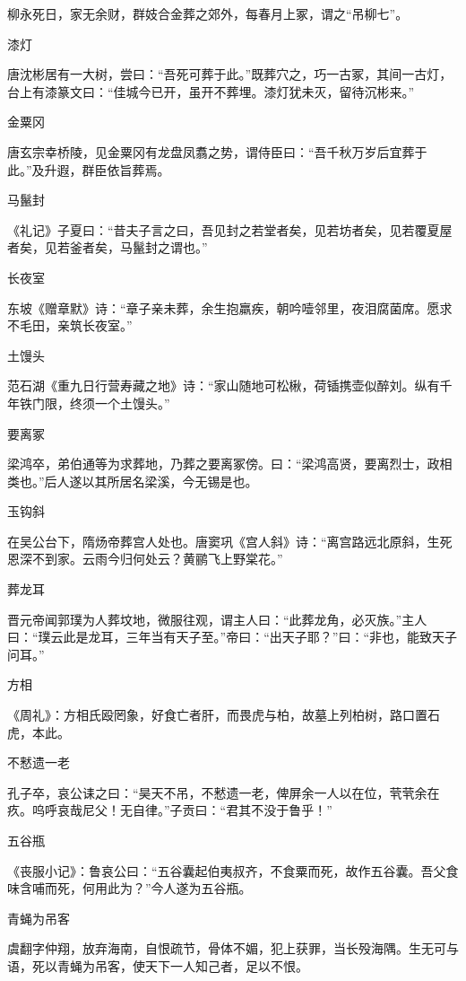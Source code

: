 \documentclass[a4paper,12pt,UTF8,twoside]{ctexbook}
\begin{document}
    柳永死日，家无余财，群妓合金葬之郊外，每春月上冢，谓之“吊柳七”。
    
    漆灯
    
    唐沈彬居有一大树，尝曰：“吾死可葬于此。”既葬穴之，巧一古冢，其间一古灯，台上有漆篆文曰：“佳城今已开，虽开不葬埋。漆灯犹未灭，留待沉彬来。”
    
    金粟冈
    
    唐玄宗幸桥陵，见金粟冈有龙盘凤翥之势，谓侍臣曰：“吾千秋万岁后宜葬于此。”及升遐，群臣依旨葬焉。
    
    马鬣封
    
    《礼记》子夏曰：“昔夫子言之曰，吾见封之若堂者矣，见若坊者矣，见若覆夏屋者矣，见若釜者矣，马鬣封之谓也。”
    
    长夜室
    
    东坡《赠章默》诗：“章子亲未葬，余生抱羸疾，朝吟噎邻里，夜泪腐菌席。愿求不毛田，亲筑长夜室。”
    
    土馒头
    
    范石湖《重九日行营寿藏之地》诗：“家山随地可松楸，荷锸携壶似醉刘。纵有千年铁门限，终须一个土馒头。”
    
    要离冢
    
    梁鸿卒，弟伯通等为求葬地，乃葬之要离冢傍。曰：“梁鸿高贤，要离烈士，政相类也。”后人遂以其所居名梁溪，今无锡是也。
    
    玉钩斜
    
    在吴公台下，隋炀帝葬宫人处也。唐窦巩《宫人斜》诗：“离宫路远北原斜，生死恩深不到家。云雨今归何处云？黄鹂飞上野棠花。”
    
    葬龙耳
    
    晋元帝闻郭璞为人葬坟地，微服往观，谓主人曰：“此葬龙角，必灭族。”主人曰：“璞云此是龙耳，三年当有天子至。”帝曰：“出天子耶？”曰：“非也，能致天子问耳。”
    
    方相
    
    《周礼》：方相氏殴罔象，好食亡者肝，而畏虎与柏，故墓上列柏树，路口置石虎，本此。
    
    不慭遗一老
    
    孔子卒，哀公诔之曰：“昊天不吊，不慭遗一老，俾屏余一人以在位，茕茕余在疚。呜呼哀哉尼父！无自律。”子贡曰：“君其不没于鲁乎！”
    
    五谷瓶
    
    《丧服小记》：鲁哀公曰：“五谷囊起伯夷叔齐，不食粟而死，故作五谷囊。吾父食味含哺而死，何用此为？”今人遂为五谷瓶。
    
    青蝇为吊客
    
    虞翻字仲翔，放弃海南，自恨疏节，骨体不媚，犯上获罪，当长殁海隅。生无可与语，死以青蝇为吊客，使天下一人知己者，足以不恨。
    
\end{document}
